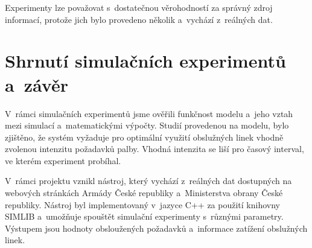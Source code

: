 \documentclass[a4paper]{article}
\begin{document}
            Experimenty lze považovat s~dostatečnou věrohodností za správný zdroj informací, protože jich bylo provedeno několik a~vychází z~reálných dat.

    \section{Shrnutí simulačních experimentů a~závěr}
    \label{sec:summary}

        V~rámci simulačních experimentů jsme ověřili funkčnost modelu a~jeho vztah mezi simulací a~matematickými výpočty. Studií provedenou na modelu, bylo zjištěno,
        že systém vyžaduje pro optimální využití obslužných linek vhodně zvolenou intenzitu požadavků palby.
        Vhodná intenzita se liší pro časový interval, ve kterém experiment probíhal.

        V~rámci projektu vznikl nástroj, který vychází z~reálných dat dostupných na webových stránkách Armády České republiky a~Ministerstva obrany České republiky.
        Nástroj byl implementovaný v~jazyce C++ za použití knihovny SIMLIB a~umožňuje spouštět simulační experimenty
        s~různými parametry. Výstupem jsou hodnoty obsloužených požadavků a~informace zatížení obslužných linek.

    \newpage

    \renewcommand{\refname}{Použitá literatura}
    
    
\end{document}
